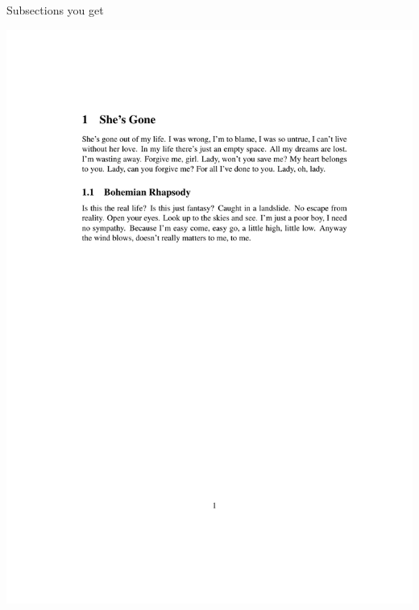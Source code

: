 \documentclass[12pt]{gshs_lecture}
\begin{document}
\begin{frame}[t]{Subsections}\small
you get
\begin{center}
\begin{framed}
\includegraphics[width=\textwidth,trim={0cm 16cm 0cm 3cm},clip]{./test_article/article003.pdf}
\end{framed}
\end{center}
\end{frame}
\end{document}
